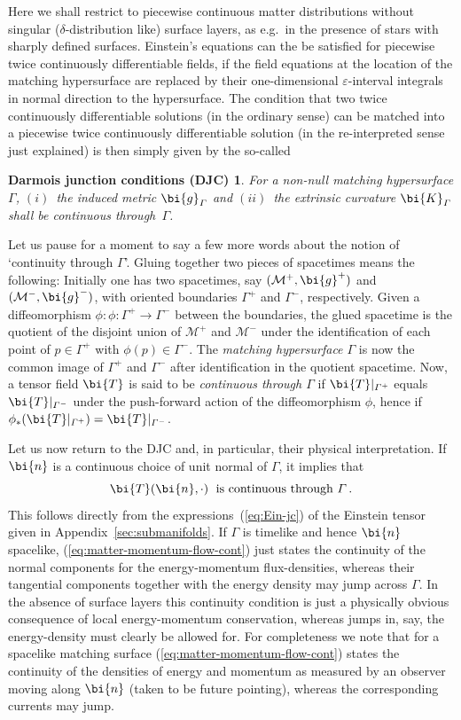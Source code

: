 \documentclass
[rmp,aps,twocolumn,showpacs,preprintnumbers,amsmath,amssymb]{revtex4}
\theoremstyle{plain}
\newtheorem*{Darmois}{Darmois junction conditions (DJC)}
\theoremstyle{definition}
\theoremstyle{remark}
\newcommand{\M}{\mathcal{M}}                      %
\newcommand{\gG}{\g_\varGamma}                    %
\newcommand{\g}{\bg}                            %
\newcommand{\bg}{\bi{g}}
\newcommand{\bn}{\bi{n}}
\newcommand{\bK}{\bi{K}}
\newcommand{\bT}{\bi{T}}
\begin{document}
Here we shall restrict to piecewise continuous matter distributions 
without singular ($\delta$-distribution like) surface layers, as e.g.~in 
the presence of stars with sharply defined surfaces. Einstein's 
equations can the be satisfied for piecewise twice continuously 
differentiable fields, if the field equations at the location of the 
matching hypersurface are replaced by their one-dimensional 
$\varepsilon$-interval integrals in normal direction to the 
hypersurface. The condition that two twice continuously 
differentiable solutions (in the ordinary sense) can be matched 
into a piecewise twice continuously differentiable solution 
(in the re-interpreted sense just explained) is then simply 
given by the so-called 
%
\begin{Darmois}\label{thm:DJC}
For a non-null matching hypersurface $\varGamma$, $(i)$~the induced metric 
$\gG$ and $(ii)$~the extrinsic curvature $\bK_\varGamma$ shall be continuous 
through~$\varGamma$.
\end{Darmois}
%
Let us pause for a moment to say a few more words about the notion 
of `continuity through $\varGamma$'. Gluing together two pieces of
spacetimes means the following: Initially one has two spacetimes, 
say $(\M^+,\g^+)$ and $(\M^-,\g^-)$, with oriented boundaries 
$\varGamma^+$ and $\varGamma^-$, respectively. Given a diffeomorphism 
$\phi:\phi:\varGamma^+\rightarrow \varGamma^-$ between the boundaries, 
the glued spacetime is the quotient of the disjoint union of $\M^+$ 
and $\M^-$ under the identification of each point of $p\in \varGamma^+$ 
with $\phi(p)\in\varGamma^-$. The \emph{matching hypersurface $\varGamma$} 
is now the common image of $\varGamma^+$ and $\varGamma^-$ after 
identification in the quotient spacetime. Now, a tensor field $\bT$ 
is said to be \emph{continuous through $\varGamma$} if $\bT|_{\varGamma^+}$ 
equals $\bT|_{\varGamma^-}$ under the push-forward action of the 
diffeomorphism $\phi$, hence if 
$\phi_*(\bT|_{\varGamma^+})=\bT|_{\varGamma^-}$.

Let us now return to the DJC and, in particular,  their physical 
interpretation. If $\bn$ is a continuous choice of unit normal 
of $\varGamma$, it implies that 
%
\begin{equation}\label{eq:matter-momentum-flow-cont}
  \bT(\bn,\cdot) \; \text{ is continuous through } \varGamma\,.
\end{equation}
%
This follows directly from the expressions~(\ref{eq:Ein-jc}) of the 
Einstein tensor given in Appendix~\ref{sec:submanifolds}. If $\varGamma$ 
is timelike and hence $\bn$ spacelike, (\ref{eq:matter-momentum-flow-cont}) 
just states the continuity of the normal components for the 
energy-momentum flux-densities, whereas their tangential components 
together with the energy density may jump across $\varGamma$. 
In the absence of surface layers this continuity condition is just 
a physically obvious consequence of local energy-momentum conservation,
whereas jumps in, say, the energy-density must clearly be allowed for. 
For completeness we note that for a spacelike matching surface 
(\ref{eq:matter-momentum-flow-cont}) states the continuity of the 
densities of energy and momentum as measured by an observer moving 
along $\bn$ (taken to be future pointing), whereas the corresponding 
currents may jump.
\end{document}

